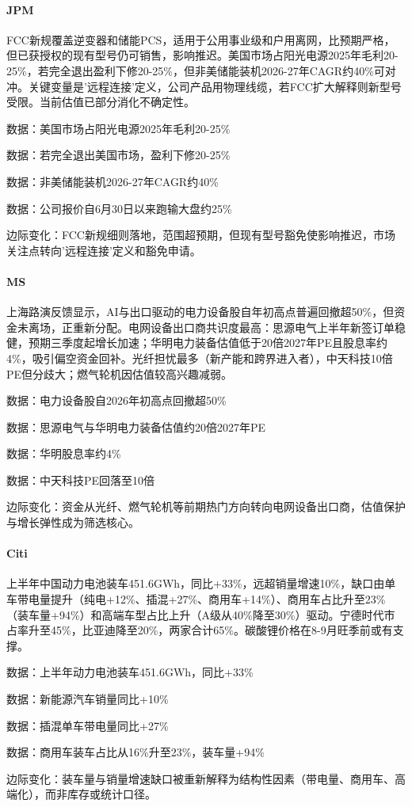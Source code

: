 \documentclass[11pt]{ctexart}
\begin{document}
\paragraph{JPM} FCC新规覆盖逆变器和储能PCS，适用于公用事业级和户用离网，比预期严格，但已获授权的现有型号仍可销售，影响推迟。美国市场占阳光电源2025年毛利20-25\%，若完全退出盈利下修20-25\%，但非美储能装机2026-27年CAGR约40\%可对冲。关键变量是'远程连接'定义，公司产品用物理线缆，若FCC扩大解释则新型号受限。当前估值已部分消化不确定性。
{\small\color{refgray}数据：美国市场占阳光电源2025年毛利20-25\%\par}
{\small\color{refgray}数据：若完全退出美国市场，盈利下修20-25\%\par}
{\small\color{refgray}数据：非美储能装机2026-27年CAGR约40\%\par}
{\small\color{refgray}数据：公司报价自6月30日以来跑输大盘约25\%\par}
{\small\color{refgray}边际变化：FCC新规细则落地，范围超预期，但现有型号豁免使影响推迟，市场关注点转向'远程连接'定义和豁免申请。\par}
\paragraph{MS} 上海路演反馈显示，AI与出口驱动的电力设备股自年初高点普遍回撤超50\%，但资金未离场，正重新分配。电网设备出口商共识度最高：思源电气上半年新签订单稳健，预期三季度起增长加速；华明电力装备估值低于20倍2027年PE且股息率约4\%，吸引偏空资金回补。光纤担忧最多（新产能和跨界进入者），中天科技10倍PE但分歧大；燃气轮机因估值较高兴趣减弱。
{\small\color{refgray}数据：电力设备股自2026年初高点回撤超50\%\par}
{\small\color{refgray}数据：思源电气与华明电力装备估值约20倍2027年PE\par}
{\small\color{refgray}数据：华明股息率约4\%\par}
{\small\color{refgray}数据：中天科技PE回落至10倍\par}
{\small\color{refgray}边际变化：资金从光纤、燃气轮机等前期热门方向转向电网设备出口商，估值保护与增长弹性成为筛选核心。\par}
\paragraph{Citi} 上半年中国动力电池装车451.6GWh，同比+33\%，远超销量增速10\%，缺口由单车带电量提升（纯电+12\%、插混+27\%、商用车+14\%）、商用车占比升至23\%（装车量+94\%）和高端车型占比上升（A级从40\%降至30\%）驱动。宁德时代市占率升至45\%，比亚迪降至20\%，两家合计65\%。碳酸锂价格在8-9月旺季前或有支撑。
{\small\color{refgray}数据：上半年动力电池装车451.6GWh，同比+33\%\par}
{\small\color{refgray}数据：新能源汽车销量同比+10\%\par}
{\small\color{refgray}数据：插混单车带电量同比+27\%\par}
{\small\color{refgray}数据：商用车装车占比从16\%升至23\%，装车量+94\%\par}
{\small\color{refgray}边际变化：装车量与销量增速缺口被重新解释为结构性因素（带电量、商用车、高端化），而非库存或统计口径。\par}
\end{document}
